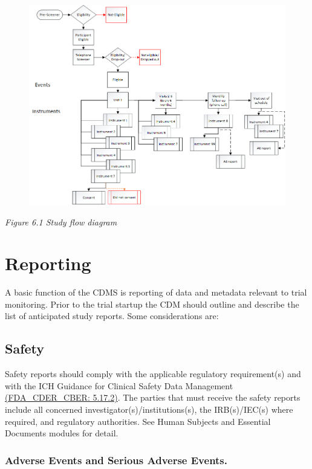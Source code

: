 \documentclass[]{book}
\theoremstyle{definition}
\theoremstyle{definition}
\theoremstyle{definition}
\theoremstyle{remark}
\begin{document}
\begin{figure}
\centering
\includegraphics{images/book/dm1.png}
\caption{}
\end{figure}

\emph{Figure 6.1 Study flow diagram}

\section{Reporting}\label{reporting}

A basic function of the CDMS is reporting of data and metadata relevant
to trial monitoring. Prior to the trial startup the CDM should outline
and describe the list of anticipated study reports. Some considerations
are:

\subsection{Safety}\label{safety}

Safety reports should comply with the applicable regulatory
requirement(s) and with the ICH Guidance for Clinical Safety Data
Management
\href{http://www.fda.gov/downloads/Drugs/.../Guidances/ucm073122.pdf}{(FDA\_CDER\_CBER:
5.17.2)}. The parties that must receive the safety reports include all
concerned investigator(s)/institutions(s), the IRB(s)/IEC(s) where
required, and regulatory authorities. See Human Subjects and Essential
Documents modules for detail.

\subsubsection{Adverse Events and Serious Adverse
Events.}\label{adverse-events-and-serious-adverse-events.}
\end{document}
